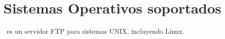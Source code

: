 \section{Sistemas Operativos soportados}

  \vsftpd\ es un servidor FTP para sistemas UNIX, incluyendo Linux.
  
